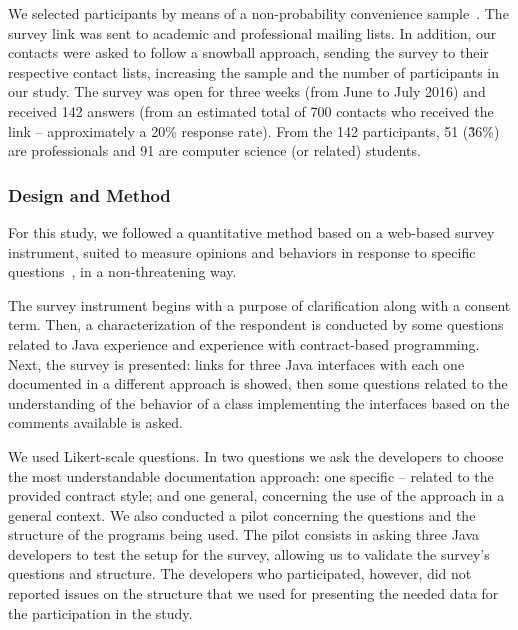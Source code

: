We selected participants by means of a non-probability  convenience sample~\cite{wohlin}. 
The survey link was sent to academic and professional mailing lists.
In addition, our contacts were asked to follow a snowball approach, sending the survey to their respective
contact lists, increasing the sample and the number of participants in our study.
The survey was open for three weeks (from June to July 2016) and received 142
answers (from an estimated total of 700 contacts who received the link -- approximately a 20\% response
rate). From the 142 participants, 51 (\~36\%) are professionals and 91 are computer science (or related) students.


\subsubsection{Design and Method}
\label{sec:surveyDes}

For this study, we followed a quantitative method based on a web-based survey instrument, suited to measure opinions and behaviors in response to specific questions~\cite{refSurvey}, in a non-threatening way. 

The survey
instrument
begins with a purpose of clarification along with a consent term.
Then, a characterization of the respondent is conducted by some questions related to Java experience and experience with contract-based programming. Next, the survey is presented: links for three Java interfaces with each one documented in a different approach is showed, then some questions related to the understanding of the behavior of a class implementing the interfaces based on the comments available is asked. 

We used Likert-scale questions. In two questions we ask the developers to choose the most understandable documentation approach: one specific -- related to the provided contract style; and one general, concerning the use of the approach in a general context.
We also conducted a pilot concerning the questions and the structure of the programs being used. The pilot consists in asking three Java
developers to test the setup for the survey, allowing us to validate the survey's questions and structure. The developers who participated, however, did not reported issues on the structure that we used for presenting the needed data for the participation in the study.

